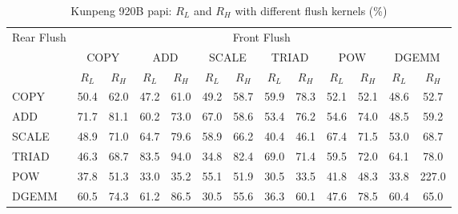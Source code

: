 \begin{table}[htbp]
\centering
\caption{Kunpeng 920B papi: $R_L$ and $R_H$ with different flush kernels (\%)}
\label{tab:frkern-c920bn3-papi}
\begin{tabular*}{\textwidth}{@{\extracolsep{\fill}}lcccccccccccc}
\toprule
\multirow{3}{*}{Rear Flush} & \multicolumn{12}{c}{Front Flush} \\ \cmidrule(lr){2-13}
& \multicolumn{2}{c}{COPY} & \multicolumn{2}{c}{ADD} & \multicolumn{2}{c}{SCALE} & \multicolumn{2}{c}{TRIAD} & \multicolumn{2}{c}{POW} & \multicolumn{2}{c}{DGEMM} \\ \cmidrule(lr){2-3} \cmidrule(lr){4-5} \cmidrule(lr){6-7} \cmidrule(lr){8-9} \cmidrule(lr){10-11} \cmidrule(lr){12-13}
& $R_L$ & $R_H$ & $R_L$ & $R_H$ & $R_L$ & $R_H$ & $R_L$ & $R_H$ & $R_L$ & $R_H$ & $R_L$ & $R_H$ \\ \midrule
COPY & 50.4 & 62.0 & 47.2 & 61.0 & 49.2 & 58.7 & 59.9 & 78.3 & 52.1 & 52.1 & 48.6 & 52.7 \\
ADD & 71.7 & 81.1 & 60.2 & 73.0 & 67.0 & 58.6 & 53.4 & 76.2 & 54.6 & 74.0 & 48.5 & 59.2 \\
SCALE & 48.9 & 71.0 & 64.7 & 79.6 & 58.9 & 66.2 & 40.4 & 46.1 & 67.4 & 71.5 & 53.0 & 68.7 \\
TRIAD & 46.3 & 68.7 & 83.5 & 94.0 & 34.8 & 82.4 & 69.0 & 71.4 & 59.5 & 72.0 & 64.1 & 78.0 \\
POW & 37.8 & 51.3 & 33.0 & 35.2 & 55.1 & 51.9 & 30.5 & 33.5 & 41.8 & 48.3 & 33.8 & 227.0 \\
DGEMM & 60.5 & 74.3 & 61.2 & 86.5 & 30.5 & 55.6 & 36.3 & 60.1 & 47.6 & 78.5 & 60.4 & 65.0 \\
\bottomrule
\end{tabular*}
\end{table}